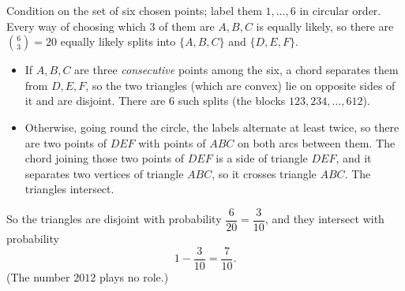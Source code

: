 Condition on the set of six chosen points; label them $1,\dots,6$ in circular order. Every way of choosing which $3$ of them are $A,B,C$ is equally likely, so there are $\binom{6}{3}=20$ equally likely splits into $\{A,B,C\}$ and $\{D,E,F\}$.

\begin{itemize}
\item If $A,B,C$ are three \emph{consecutive} points among the six, a chord separates them from $D,E,F$, so the two triangles (which are convex) lie on opposite sides of it and are disjoint. There are $6$ such splits (the blocks $123,234,\dots,612$).
\item Otherwise, going round the circle, the labels alternate at least twice, so there are two points of $DEF$ with points of $ABC$ on both arcs between them. The chord joining those two points of $DEF$ is a side of triangle $DEF$, and it separates two vertices of triangle $ABC$, so it crosses triangle $ABC$. The triangles intersect.
\end{itemize}
So the triangles are disjoint with probability $\dfrac{6}{20}=\dfrac{3}{10}$, and they intersect with probability
\[
1-\dfrac{3}{10}=\boxed{\dfrac{7}{10}}.
\]
(The number $2012$ plays no role.)
